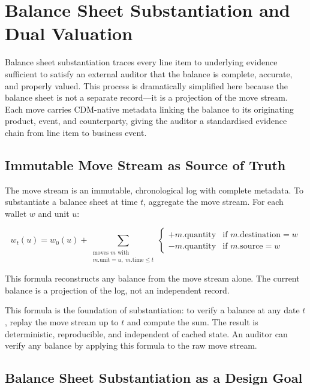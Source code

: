 \documentclass[11pt,a4paper]{article}
\begin{document}
\clearpage
\section{Balance Sheet Substantiation and Dual Valuation}
\label{sec:substantiation}

Balance sheet substantiation traces every line item to underlying evidence sufficient to satisfy an external auditor that the balance is complete, accurate, and properly valued. This process is dramatically simplified here because the balance sheet is not a separate record---it is a projection of the move stream. Each move carries CDM-native metadata linking the balance to its originating product, event, and counterparty, giving the auditor a standardised evidence chain from line item to business event.

\subsection{Immutable Move Stream as Source of Truth}

The move stream is an immutable, chronological log with complete metadata. To substantiate a balance sheet at time $t$, aggregate the move stream. For each wallet $w$ and unit $u$:

\[
w_t(u) = w_0(u) + \sum_{\substack{\text{moves } m \text{ with} \\ m.\text{unit} = u,\; m.\text{time} \leq t}}
\begin{cases}
+m.\text{quantity} & \text{if } m.\text{destination} = w \\
-m.\text{quantity} & \text{if } m.\text{source} = w
\end{cases}
\]

This formula reconstructs any balance from the move stream alone. The current balance is a projection of the log, not an independent record.

This formula is the foundation of substantiation: to verify a balance at any date $t$, replay the move stream up to $t$ and compute the sum. The result is deterministic, reproducible, and independent of cached state. An auditor can verify any balance by applying this formula to the raw move stream.

\subsection{Balance Sheet Substantiation as a Design Goal}
\end{document}

